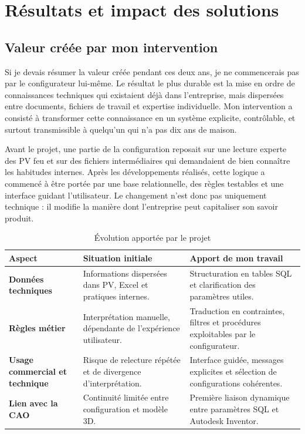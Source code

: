 \chapter{Résultats et impact des solutions}

\section{Valeur créée par mon intervention}

Si je devais résumer la valeur créée pendant ces deux ans, je ne commencerais pas par le configurateur lui-même. Le résultat le plus durable est la mise en ordre de connaissances techniques qui existaient déjà dans l'entreprise, mais dispersées entre documents, fichiers de travail et expertise individuelle. Mon intervention a consisté à transformer cette connaissance en un système explicite, contrôlable, et surtout transmissible à quelqu'un qui n'a pas dix ans de maison.

Avant le projet, une partie de la configuration reposait sur une lecture experte des PV feu et sur des fichiers intermédiaires qui demandaient de bien connaître les habitudes internes. Après les développements réalisés, cette logique a commencé à être portée par une base relationnelle, des règles testables et une interface guidant l'utilisateur. Le changement n'est donc pas uniquement technique : il modifie la manière dont l'entreprise peut capitaliser son savoir produit.

\begin{table}[H]
\centering
\caption{Évolution apportée par le projet}
\begin{tabularx}{\textwidth}{>{\bfseries}p{}X X}
\toprule
Aspect & Situation initiale & Apport de mon travail \\
\midrule
Données techniques & Informations dispersées dans PV, Excel et pratiques internes. & Structuration en tables SQL et clarification des paramètres utiles. \\
Règles métier & Interprétation manuelle, dépendante de l'expérience utilisateur. & Traduction en contraintes, filtres et procédures exploitables par le configurateur. \\
Usage commercial et technique & Risque de relecture répétée et de divergence d'interprétation. & Interface guidée, messages explicites et sélection de configurations cohérentes. \\
Lien avec la CAO & Continuité limitée entre configuration et modèle 3D. & Première liaison dynamique entre paramètres SQL et Autodesk Inventor. \\
\bottomrule
\end{tabularx}
\end{table}

